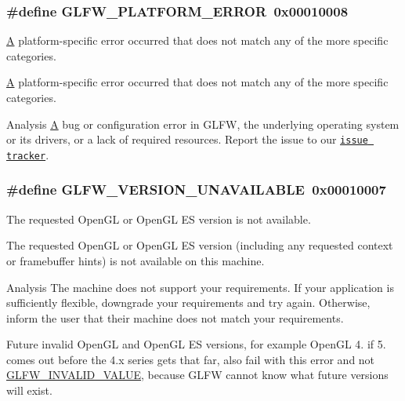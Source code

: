 \subsubsection[{G\+L\+F\+W\+\_\+\+P\+L\+A\+T\+F\+O\+R\+M\+\_\+\+E\+R\+R\+O\+R}]{\setlength{\rightskip}{0pt plus 5cm}\#define G\+L\+F\+W\+\_\+\+P\+L\+A\+T\+F\+O\+R\+M\+\_\+\+E\+R\+R\+O\+R~0x00010008}\label{group__errors_gad44162d78100ea5e87cdd38426b8c7a1}


\hyperlink{structA}{A} platform-\/specific error occurred that does not match any of the more specific categories. 

\hyperlink{structA}{A} platform-\/specific error occurred that does not match any of the more specific categories.

\begin{DoxyParagraph}{Analysis}
\hyperlink{structA}{A} bug or configuration error in G\+L\+F\+W, the underlying operating system or its drivers, or a lack of required resources. Report the issue to our \href{https://github.com/glfw/glfw/issues}{\tt issue tracker}. 
\end{DoxyParagraph}
\hypertarget{group__errors_gad16c5565b4a69f9c2a9ac2c0dbc89462}{}
\subsubsection[{G\+L\+F\+W\+\_\+\+V\+E\+R\+S\+I\+O\+N\+\_\+\+U\+N\+A\+V\+A\+I\+L\+A\+B\+L\+E}]{\setlength{\rightskip}{0pt plus 5cm}\#define G\+L\+F\+W\+\_\+\+V\+E\+R\+S\+I\+O\+N\+\_\+\+U\+N\+A\+V\+A\+I\+L\+A\+B\+L\+E~0x00010007}\label{group__errors_gad16c5565b4a69f9c2a9ac2c0dbc89462}


The requested Open\+G\+L or Open\+G\+L E\+S version is not available. 

The requested Open\+G\+L or Open\+G\+L E\+S version (including any requested context or framebuffer hints) is not available on this machine.

\begin{DoxyParagraph}{Analysis}
The machine does not support your requirements. If your application is sufficiently flexible, downgrade your requirements and try again. Otherwise, inform the user that their machine does not match your requirements.
\end{DoxyParagraph}
\begin{DoxyParagraph}{}
Future invalid Open\+G\+L and Open\+G\+L E\+S versions, for example Open\+G\+L 4. if 5. comes out before the 4.\+x series gets that far, also fail with this error and not \hyperlink{group__errors_gaaf2ef9aa8202c2b82ac2d921e554c687}{G\+L\+F\+W\+\_\+\+I\+N\+V\+A\+L\+I\+D\+\_\+\+V\+A\+L\+U\+E}, because G\+L\+F\+W cannot know what future versions will exist. 
\end{DoxyParagraph}

